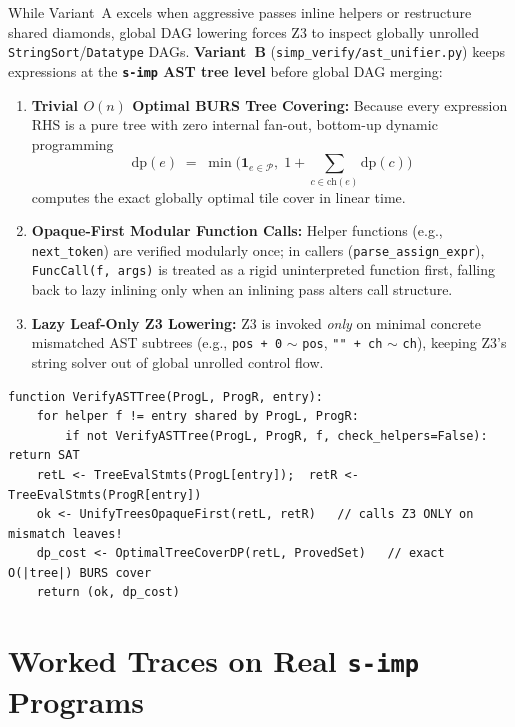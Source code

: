 \documentclass[11pt,a4paper]{article}
\begin{document}
While Variant~A excels when aggressive passes inline helpers or restructure shared diamonds, global DAG lowering forces Z3 to inspect globally unrolled \texttt{StringSort}/\texttt{Datatype} DAGs. \textbf{Variant~B} (\texttt{simp\_verify/ast\_unifier.py}) keeps expressions at the \textbf{\texttt{s-imp} AST tree level} before global DAG merging:
\begin{enumerate}
  \item \textbf{Trivial $O(n)$ Optimal BURS Tree Covering:} Because every expression RHS is a pure tree with zero internal fan-out, bottom-up dynamic programming
  \[
    \mathrm{dp}(e) \;=\; \min\Big(\mathbf{1}_{e \in \mathcal{P}},\; 1 + \sum_{c \in \mathrm{ch}(e)} \mathrm{dp}(c)\Big)
  \]
  computes the exact globally optimal tile cover in linear time.
  \item \textbf{Opaque-First Modular Function Calls:} Helper functions (e.g., \texttt{next\_token}) are verified modularly once; in callers (\texttt{parse\_assign\_expr}), \texttt{FuncCall(f, args)} is treated as a rigid uninterpreted function first, falling back to lazy inlining only when an inlining pass alters call structure.
  \item \textbf{Lazy Leaf-Only Z3 Lowering:} Z3 is invoked \emph{only} on minimal concrete mismatched AST subtrees (e.g., \texttt{pos + 0} $\sim$ \texttt{pos}, \texttt{"" + ch} $\sim$ \texttt{ch}), keeping Z3's string solver out of global unrolled control flow.
\end{enumerate}

\begin{lstlisting}[caption={Algorithm 8: Variant B (\texttt{ASTTreeUnifier}) in \texttt{simp\_verify/ast\_unifier.py}.}]
function VerifyASTTree(ProgL, ProgR, entry):
    for helper f != entry shared by ProgL, ProgR:
        if not VerifyASTTree(ProgL, ProgR, f, check_helpers=False): return SAT
    retL <- TreeEvalStmts(ProgL[entry]);  retR <- TreeEvalStmts(ProgR[entry])
    ok <- UnifyTreesOpaqueFirst(retL, retR)   // calls Z3 ONLY on mismatch leaves!
    dp_cost <- OptimalTreeCoverDP(retL, ProvedSet)   // exact O(|tree|) BURS cover
    return (ok, dp_cost)
\end{lstlisting}

\section{Worked Traces on Real \texttt{s-imp} Programs}
\label{sec:traces}
\end{document}
